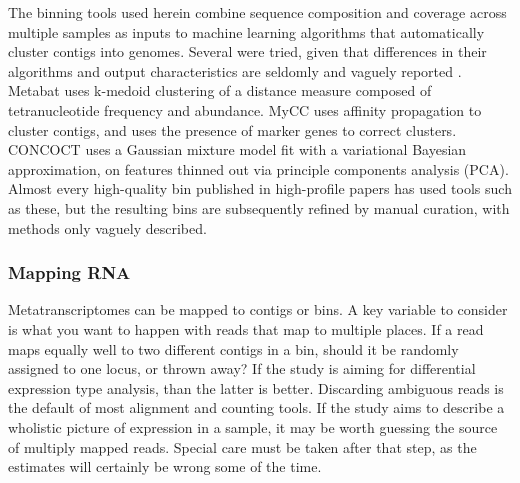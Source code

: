 The binning tools used herein combine sequence composition and coverage across multiple samples as inputs to machine learning algorithms that automatically cluster contigs into genomes.
Several were tried, given that differences in their algorithms and output characteristics are seldomly and vaguely reported \cite{sangwan2016}.
Metabat \cite{metabat2015} uses k-medoid clustering of a distance measure composed of tetranucleotide frequency and abundance.
MyCC \cite{mycc2016} uses affinity propagation to cluster contigs, and uses the presence of marker genes to correct clusters.
CONCOCT \cite{concoct2014} uses a Gaussian mixture model fit with a variational Bayesian approximation, on features thinned out via principle components analysis (PCA).
Almost every high-quality bin published in high-profile papers has used tools such as these, but the resulting bins are subsequently refined by manual curation, with methods only vaguely described.

\subsubsection{Mapping RNA}
Metatranscriptomes can be mapped to contigs or bins.
A key variable to consider is what you want to happen with reads that map to multiple places.
If a read maps equally well to two different contigs in a bin, should it be randomly assigned to one locus, or thrown away?
If the study is aiming for differential expression type analysis, than the latter is better.
Discarding ambiguous reads is the default of most alignment and counting tools.
If the study aims to describe a wholistic picture of expression in a sample, it may be worth guessing the source of multiply mapped reads.
Special care must be taken after that step, as the estimates will certainly be wrong some of the time.


